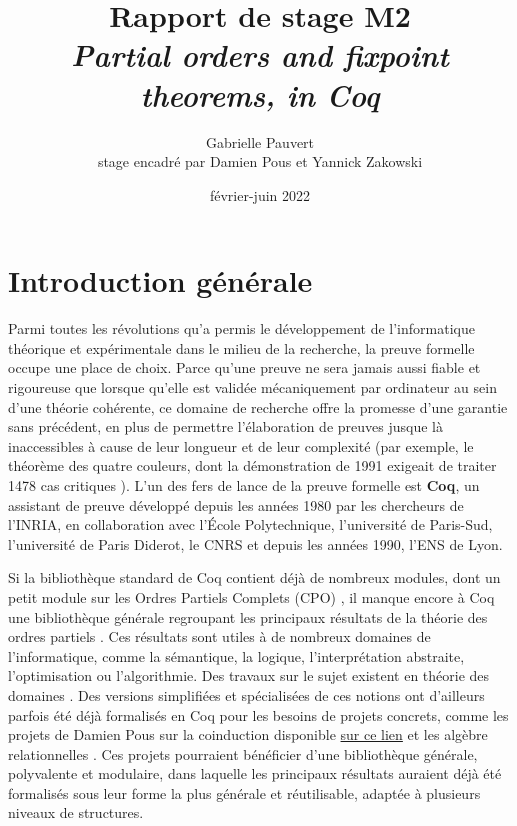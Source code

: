\documentclass{article}
\title{Rapport de stage M2 \\ 
\textit{Partial orders and fixpoint theorems, in Coq}}
\date{février-juin 2022}
\author{Gabrielle Pauvert\\
stage encadré par Damien Pous et Yannick Zakowski}
\theoremstyle{definition}
\begin{document}
\maketitle

\section*{Introduction générale}

Parmi toutes les révolutions qu'a permis le développement de l'informatique théorique et expérimentale dans le milieu de la recherche, la preuve formelle occupe une place de choix. Parce qu'une preuve ne sera jamais aussi fiable et rigoureuse que lorsque qu'elle est validée mécaniquement par ordinateur au sein d'une théorie cohérente, ce domaine de recherche offre la promesse d'une garantie sans précédent, en plus de permettre l'élaboration de preuves jusque là inaccessibles à cause de leur longueur et de leur complexité (par exemple, le théorème des quatre couleurs, dont la démonstration de 1991 exigeait de traiter 1478 cas critiques \cite{4color}). L'un des fers de lance de la preuve formelle est \textbf{Coq}, un assistant de preuve développé depuis les années 1980 par les chercheurs de l'INRIA, en collaboration avec l'École Polytechnique, l'université de Paris-Sud, l'université de Paris Diderot, le CNRS et depuis les années 1990, l'ENS de Lyon.

Si la bibliothèque standard de Coq contient déjà de nombreux modules, dont un petit module sur les Ordres Partiels Complets (CPO) \cite{coqCPO}, il manque encore à Coq une bibliothèque générale regroupant les principaux résultats de la théorie des ordres partiels \cite{main}. Ces résultats sont utiles à de nombreux domaines de l'informatique, comme la sémantique, la logique, l'interprétation abstraite, l'optimisation ou l'algorithmie. Des travaux sur le sujet existent en théorie des domaines \cite{dockins}. Des versions simplifiées et spécialisées de ces notions ont d'ailleurs parfois été déjà formalisés en Coq pour les besoins de projets concrets, comme les projets de Damien Pous sur la coinduction \cite{coind-theory} disponible \href{https://github.com/damien-pous/coinduction}{sur ce lien} et les algèbre relationnelles \cite{relalg}. Ces projets pourraient bénéficier d'une bibliothèque générale, polyvalente et modulaire, dans laquelle les principaux résultats auraient déjà été formalisés sous leur forme la plus générale et réutilisable, adaptée à plusieurs niveaux de structures.
\end{document}
